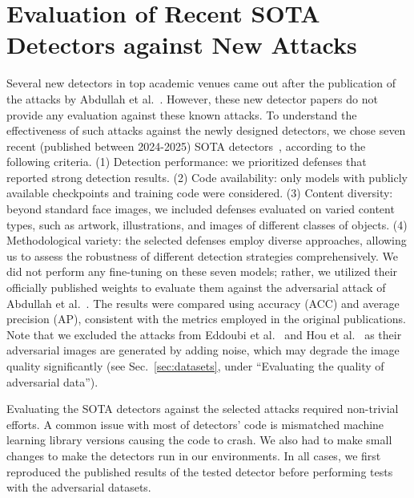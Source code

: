 \documentclass[letterpaper,twocolumn,10pt]{article}
\begin{document}
\section{Evaluation of Recent SOTA Detectors against New Attacks}
\label{sec:sota-eval}
Several new detectors in top academic venues came out after the publication of the attacks by Abdullah et al.~\cite{Sifat2024evolvingthreat}. However, these new detector papers do not provide any evaluation against these known attacks. 
To understand the effectiveness of such attacks against the newly designed detectors, we chose seven recent (published between 2024-2025) SOTA  detectors~\cite{Karageorgiou2025anyresolution,Chu2025fire,yang2025d3,Cheng2025cospy,Brokman2025manifold,Lorch2024landscape,Tan2024upsampling}, according to the following criteria. 
(1) Detection performance: we prioritized defenses that reported strong detection results.
(2) Code availability: only models with publicly available checkpoints and training code were considered. 
(3) Content diversity: beyond standard face images, we included defenses evaluated on varied content types, such as artwork, illustrations, and images of different classes of objects. (4) Methodological variety: the selected defenses employ diverse approaches, allowing us to assess the robustness of different detection strategies comprehensively.
We did not perform any fine-tuning on these seven models; rather, we utilized their officially published weights to evaluate them against the adversarial attack of Abdullah et al.~\cite{Sifat2024evolvingthreat}. The results were compared using accuracy (ACC) and average precision (AP), consistent with the metrics employed in the original publications.
Note that
we excluded the attacks from Eddoubi et al.~\cite{eddoubi2025raiddatasettestingadversarial} and Hou et al.~\cite{Hou2023adversarial} as their adversarial images are generated by adding noise, which may degrade the image quality significantly (see Sec.~\ref{sec:datasets}, under ``Evaluating the quality of adversarial data'').  


Evaluating the SOTA detectors against the selected attacks required non-trivial efforts. A common issue with most of detectors' code is mismatched machine learning library versions causing the code to crash. 
We also had to make small changes to make the detectors run in our environments. 
In all cases, we first reproduced the published results of the tested detector before performing tests with the adversarial datasets. 
\end{document}
